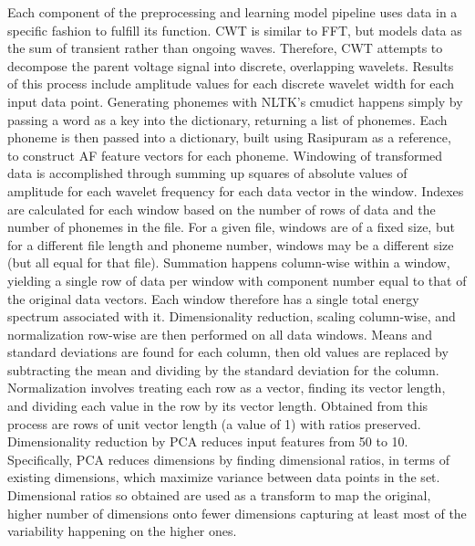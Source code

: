 \documentclass[conference]{IEEEtran}
\begin{document}
Each component of the preprocessing and learning model pipeline uses data in a specific fashion to fulfill its function. CWT is similar to FFT, but models data as the sum of transient rather than ongoing waves. Therefore, CWT attempts to decompose the parent voltage signal into discrete, overlapping wavelets. Results of this process include amplitude values for each discrete wavelet width for each input data point. Generating phonemes with NLTK's cmudict happens simply by passing a word as a key into the dictionary, returning a list of phonemes. Each phoneme is then passed into a dictionary, built using Rasipuram as a reference, to construct AF feature vectors for each phoneme. Windowing of transformed data is accomplished through summing up squares of absolute values of amplitude for each wavelet frequency for each data vector in the window. Indexes are calculated for each window based on the number of rows of data and the number of phonemes in the file. For a given file, windows are of a fixed size, but for a different file length and phoneme number, windows may be a different size (but all equal for that file). Summation happens column-wise within a window, yielding a single row of data per window with component number equal to that of the original data vectors. Each window therefore has a single total energy spectrum associated with it. Dimensionality reduction, scaling column-wise, and normalization row-wise are then performed on all data windows. Means and standard deviations are found for each column, then old values are replaced by subtracting the mean and dividing by the standard deviation for the column. Normalization involves treating each row as a vector, finding its vector length, and dividing each value in the row by its vector length. Obtained from this process are rows of unit vector length (a value of 1) with ratios preserved. Dimensionality reduction by PCA reduces input features from 50 to 10. Specifically, PCA reduces dimensions by finding dimensional ratios, in terms of existing dimensions, which maximize variance between data points in the set. Dimensional ratios so obtained are used as a transform to map the original, higher number of dimensions onto fewer dimensions capturing at least most of the variability happening on the higher ones.
\end{document}
